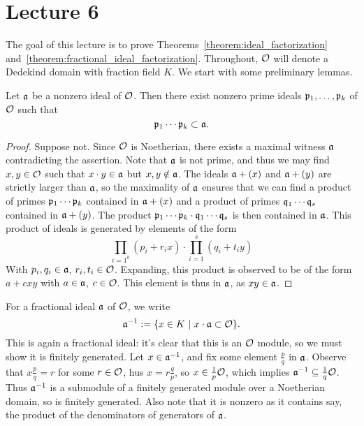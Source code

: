 \section{Lecture 6}

The goal of this lecture is to prove Theorems~\ref{theorem:ideal_factorization} and~\ref{theorem:fractional_ideal_factorization}.
Throughout, $\mathcal{O}$ will denote a Dedekind domain with fraction field $K$.
We start with some preliminary lemmas.

\begin{lemma}
  Let $\mathfrak{a}$ be a nonzero ideal of $\mathcal{O}$.
  Then there exist nonzero prime ideals $\mathfrak{p}_{1},\ldots,\mathfrak{p}_{k}$ of $\mathcal{O}$ such that
  \[ \mathfrak{p}_{1} \cdots \mathfrak{p}_{k} \subset \mathfrak{a}. \]
\end{lemma}
\begin{proof}
  Suppose not.
  Since $\mathcal{O}$ is Noetherian, there exists a maximal witness $\mathfrak{a}$ contradicting the assertion.
  Note that $\mathfrak{a}$ is not prime, and thus we may find $x,y \in \mathcal{O}$ such that $x \cdot y \in \mathfrak{a}$ but $x,y \notin \mathfrak{a}$.
  The ideals $\mathfrak{a} + (x)$ and $\mathfrak{a} + (y)$ are strictly larger than $\mathfrak{a}$, so the maximality of $\mathfrak{a}$ ensures that we can find a product of primes $\mathfrak{p}_{1} \cdots \mathfrak{p}_{k}$ contained in $\mathfrak{a} + (x)$ and a product of primes $\mathfrak{q}_{1} \cdots \mathfrak{q}_{s}$ contained in $\mathfrak{a} + (y)$.
  The product $\mathfrak{p}_{1} \cdots \mathfrak{p}_{k} \cdot \mathfrak{q}_{1} \cdots \mathfrak{q}_{s}$ is then contained in $\mathfrak{a}$.
  This product of ideals is generated by elements of the form
  \[\prod_{i=1^k}(p_i+r_ix)\cdot\prod_{i=1}^s(q_i+t_iy)\]
  With $p_i, q_i \in \mathfrak{a}$, $r_i, t_i \in \mathcal{O}$. 
  Expanding, this product is observed to be of the form $a+cxy$ with $a \in \mathfrak{a}$, $c \in \mathcal{O}$.
  This element is thus in $\mathfrak{a}$, as $xy \in \mathfrak{a}$.
\end{proof}

\begin{definition}
  For a fractional ideal $\mathfrak{a}$ of $\mathcal{O}$, we write
  \[ \mathfrak{a}^{-1} := \{x \in K \ | \ x \cdot \mathfrak{a} \subset \mathcal{O}\}. \]
  This is again a fractional ideal: it's clear that this is an $\mathcal{O}$ module, so we must show it is finitely generated.
  Let $x \in \mathfrak{a}^{-1}$, and fix some element $\frac pq$ in $\mathfrak{a}$.
  Observe that $x\frac pq=r$ for some $r\in \mathcal{O}$,  hus $x=r\frac qp$, so $x \in \frac 1p \mathcal{O}$, which implies $\mathfrak{a}^{-1}\subseteq \frac 1q \mathcal{O}$.
  Thus $\mathfrak{a}^{-1}$ is a submodule of a finitely generated module over a Noetherian domain, so is finitely generated.
  Also note that it is nonzero as it contains say, the product of the denominators of generators of $\mathfrak{a}$. 
\end{definition}

